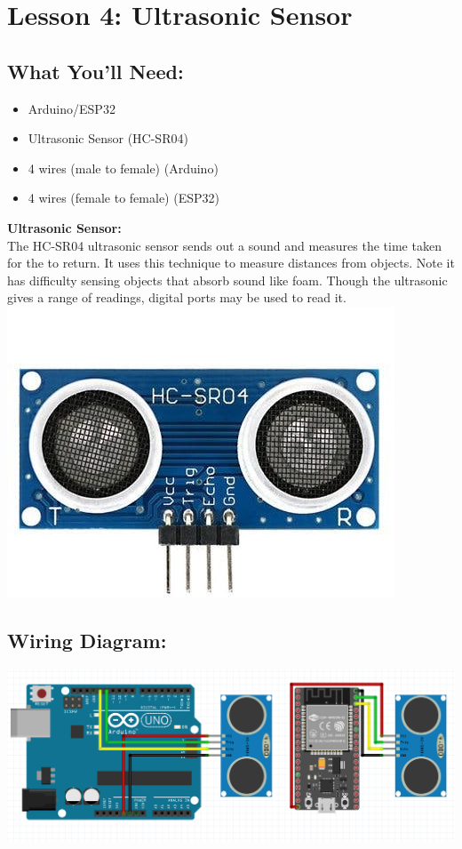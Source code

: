 \documentclass[a4paper,12pt]{report}
\newcommand{\diagramWidth}{150mm}
\begin{document}
\newpage
\section*{Lesson 4: Ultrasonic Sensor}
    \subsection*{What You'll Need:}
        \begin{itemize}
            \item Arduino/ESP32
            \item Ultrasonic Sensor (HC-SR04)
            \item 4 wires (male to female) (Arduino)
            \item 4 wires (female to female) (ESP32)
        \end{itemize}
        \begin{mdframed}[linewidth = 3, linecolor = turbo_purple]
            \textbf{Ultrasonic Sensor:} \\
            The HC-SR04 ultrasonic sensor sends out a sound and measures the time taken for the to return. It uses this technique to measure distances from objects. Note it has difficulty sensing objects that absorb sound like foam. Though the ultrasonic gives a range of readings, digital ports may be used to read it. \\
            \includegraphics[scale = 0.3]{Assets/Ultrasonic.jpg}
        \end{mdframed}
    \subsection*{Wiring Diagram:}
        \includegraphics[width = \diagramWidth]{Assets/arduino_esp_ultrasonic.png}
\end{document}
